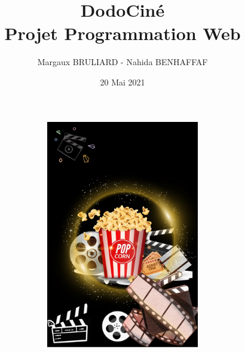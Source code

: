 \documentclass[a4paper, 11pt]{MyReport}
\author{Margaux BRULIARD - Nahida BENHAFFAF}
\title{DodoCiné \\ \vspace*{0.5cm}Projet Programmation Web}
\date{20 Mai 2021}
\begin{document}
	\begin{printTitle}
		\begin{figure}[!ht]
			\centering
			\includegraphics[width=15cm, height=10cm]{img/back.jpg}
		\end{figure}
	\end{printTitle}

	\tableofcontents
	\newpage

	

	

	
	
	
\end{document}
